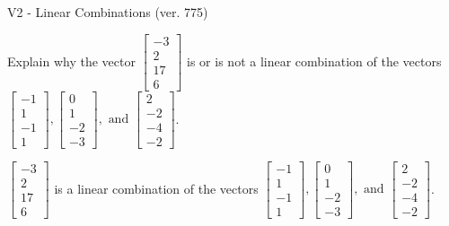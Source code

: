 \begin{exercise}
  \begin{exerciseTitle}V2 - Linear Combinations (ver. 775)\end{exerciseTitle}
  \begin{exerciseStatement}
    Explain why the vector \(\left[\begin{array}{c}
-3 \\
2 \\
17 \\
6
\end{array}\right]\)  is or is not a linear 
	combination of the vectors \(\left[\begin{array}{c}
-1 \\
1 \\
-1 \\
1
\end{array}\right] , \left[\begin{array}{c}
0 \\
1 \\
-2 \\
-3
\end{array}\right] , \text{ and } \left[\begin{array}{c}
2 \\
-2 \\
-4 \\
-2
\end{array}\right]\).
	


  \end{exerciseStatement}
  \begin{exerciseAnswer}
   \(\left[\begin{array}{c}
-3 \\
2 \\
17 \\
6
\end{array}\right]\) 
  	 is  
	a linear combination of the vectors \(\left[\begin{array}{c}
-1 \\
1 \\
-1 \\
1
\end{array}\right] , \left[\begin{array}{c}
0 \\
1 \\
-2 \\
-3
\end{array}\right] , \text{ and } \left[\begin{array}{c}
2 \\
-2 \\
-4 \\
-2
\end{array}\right]\).

	
  


  \end{exerciseAnswer}
\end{exercise}